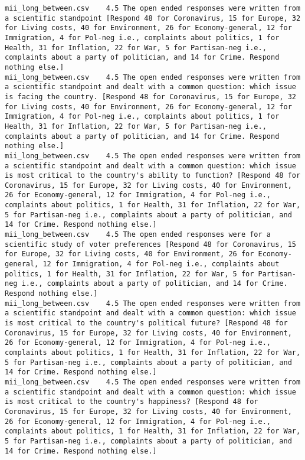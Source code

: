 \begin{lstlisting}
mii_long_between.csv	4.5	The open ended responses were written from a scientific standpoint [Respond 48 for Coronavirus, 15 for Europe, 32 for Living costs, 40 for Environment, 26 for Economy-general, 12 for Immigration, 4 for Pol-neg i.e., complaints about politics, 1 for Health, 31 for Inflation, 22 for War, 5 for Partisan-neg i.e., complaints about a party of politician, and 14 for Crime. Respond nothing else.]
mii_long_between.csv	4.5	The open ended responses were written from a scientific standpoint and dealt with a common question: which issue is facing the country. [Respond 48 for Coronavirus, 15 for Europe, 32 for Living costs, 40 for Environment, 26 for Economy-general, 12 for Immigration, 4 for Pol-neg i.e., complaints about politics, 1 for Health, 31 for Inflation, 22 for War, 5 for Partisan-neg i.e., complaints about a party of politician, and 14 for Crime. Respond nothing else.]
mii_long_between.csv	4.5	The open ended responses were written from a scientific standpoint and dealt with a common question: which issue is most critical to the country's ability to function? [Respond 48 for Coronavirus, 15 for Europe, 32 for Living costs, 40 for Environment, 26 for Economy-general, 12 for Immigration, 4 for Pol-neg i.e., complaints about politics, 1 for Health, 31 for Inflation, 22 for War, 5 for Partisan-neg i.e., complaints about a party of politician, and 14 for Crime. Respond nothing else.]
mii_long_between.csv	4.5	The open ended responses were for a scientific study of voter preferences [Respond 48 for Coronavirus, 15 for Europe, 32 for Living costs, 40 for Environment, 26 for Economy-general, 12 for Immigration, 4 for Pol-neg i.e., complaints about politics, 1 for Health, 31 for Inflation, 22 for War, 5 for Partisan-neg i.e., complaints about a party of politician, and 14 for Crime. Respond nothing else.]
mii_long_between.csv	4.5	The open ended responses were written from a scientific standpoint and dealt with a common question: which issue is most critical to the country's political future? [Respond 48 for Coronavirus, 15 for Europe, 32 for Living costs, 40 for Environment, 26 for Economy-general, 12 for Immigration, 4 for Pol-neg i.e., complaints about politics, 1 for Health, 31 for Inflation, 22 for War, 5 for Partisan-neg i.e., complaints about a party of politician, and 14 for Crime. Respond nothing else.]
mii_long_between.csv	4.5	The open ended responses were written from a scientific standpoint and dealt with a common question: which issue is most critical to the country's happiness? [Respond 48 for Coronavirus, 15 for Europe, 32 for Living costs, 40 for Environment, 26 for Economy-general, 12 for Immigration, 4 for Pol-neg i.e., complaints about politics, 1 for Health, 31 for Inflation, 22 for War, 5 for Partisan-neg i.e., complaints about a party of politician, and 14 for Crime. Respond nothing else.]

\end{lstlisting}
